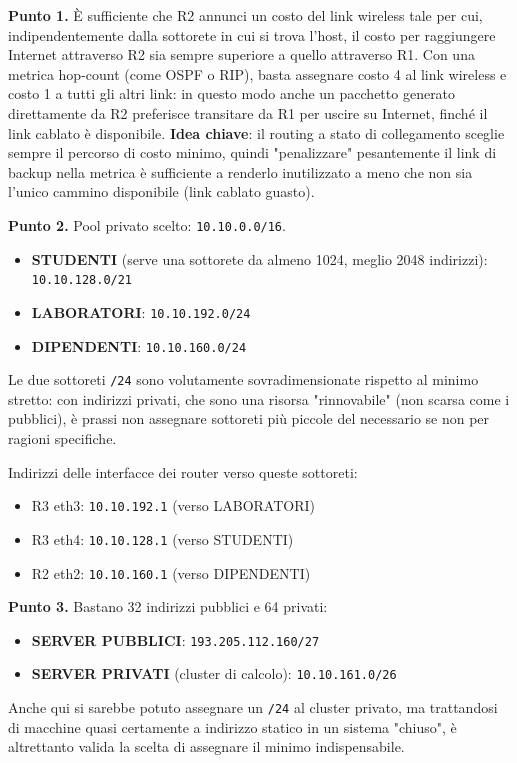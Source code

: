 \documentclass[12pt, a4paper]{article}
\begin{document}
\textbf{Punto 1.} È sufficiente che R2 annunci un costo del link wireless tale per cui, indipendentemente dalla sottorete in cui si trova l'host, il costo per raggiungere Internet attraverso R2 sia sempre superiore a quello attraverso R1. Con una metrica hop-count (come OSPF o RIP), basta assegnare costo 4 al link wireless e costo 1 a tutti gli altri link: in questo modo anche un pacchetto generato direttamente da R2 preferisce transitare da R1 per uscire su Internet, finché il link cablato è disponibile. \textbf{Idea chiave}: il routing a stato di collegamento sceglie sempre il percorso di costo minimo, quindi "penalizzare" pesantemente il link di backup nella metrica è sufficiente a renderlo inutilizzato a meno che non sia l'unico cammino disponibile (link cablato guasto).

\textbf{Punto 2.} Pool privato scelto: \texttt{10.10.0.0/16}.
\begin{itemize}
    \item \textbf{STUDENTI} (serve una sottorete da almeno 1024, meglio 2048 indirizzi): \texttt{10.10.128.0/21}
    \item \textbf{LABORATORI}: \texttt{10.10.192.0/24}
    \item \textbf{DIPENDENTI}: \texttt{10.10.160.0/24}
\end{itemize}
Le due sottoreti \texttt{/24} sono volutamente sovradimensionate rispetto al minimo stretto: con indirizzi privati, che sono una risorsa "rinnovabile" (non scarsa come i pubblici), è prassi non assegnare sottoreti più piccole del necessario se non per ragioni specifiche.

Indirizzi delle interfacce dei router verso queste sottoreti:
\begin{itemize}
    \item R3 eth3: \texttt{10.10.192.1} (verso LABORATORI)
    \item R3 eth4: \texttt{10.10.128.1} (verso STUDENTI)
    \item R2 eth2: \texttt{10.10.160.1} (verso DIPENDENTI)
\end{itemize}

\textbf{Punto 3.} Bastano 32 indirizzi pubblici e 64 privati:
\begin{itemize}
    \item \textbf{SERVER PUBBLICI}: \texttt{193.205.112.160/27}
    \item \textbf{SERVER PRIVATI} (cluster di calcolo): \texttt{10.10.161.0/26}
\end{itemize}
Anche qui si sarebbe potuto assegnare un \texttt{/24} al cluster privato, ma trattandosi di macchine quasi certamente a indirizzo statico in un sistema "chiuso", è altrettanto valida la scelta di assegnare il minimo indispensabile.
\end{document}
